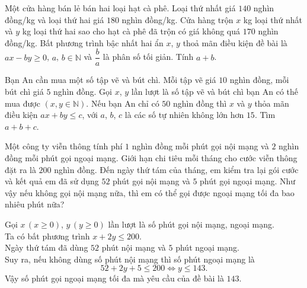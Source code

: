 \begin{bt}%
	Một cửa hàng bán lẻ bán hai loại hạt cà phê. Loại thứ nhất giá $140$ nghìn đồng/kg và loại thứ hai giá $180$ nghìn đồng/kg. Cửa hàng trộn $x$ kg loại thứ nhất và $y$ kg loại thứ hai sao cho hạt cà phê đã trộn có giá không quá $170$ nghìn đồng/kg. Bất phương trình bậc nhất hai ẩn $x$, $y$ thoả mãn điều kiện đề bài là $ax-by\ge 0$, $a$, $b\in \mathbb{N}$ và $\dfrac{b}{a}$ là phân số tối giản. Tính $a+b$. 
	
\end{bt}

\begin{bt}%
	Bạn An cần mua một số tập vẽ và bút chì. Mỗi tập vẽ giá $10$ nghìn đồng, mỗi bút chì giá $5$ nghìn đồng. Gọi $x$, $y$ lần lượt là số tập vẽ và bút chì bạn $\mathrm{An}$ có thế mua được $(x, y \in \mathbb{N})$. Nếu bạn An chỉ có $50$ nghìn đồng thì $x$ và $y$ thỏa mãn điều kiện $ a x + by \leq c$, với $a$, $b$, $c$ là các số tự nhiên không lớn hơn $15$. Tìm $ a+ b + c$.
	
\end{bt}

\begin{bt}%
	Một công ty viễn thông tính phí $1$ nghìn đồng mỗi phút gọi nội mạng và $2$ nghìn đồng mỗi phút gọi ngoại mạng. Giới hạn chi tiêu mỗi tháng cho cước viễn thông đặt ra là $200$ nghìn đồng. Đến ngày thứ tám của tháng, em kiểm tra lại gói cước và kết quả em đã sử dụng $52$ phút gọi nội mạng và $5$ phút gọi ngoại mạng. Như vậy nếu không gọi nội mạng nữa, thì em có thể gọi được ngoại mạng tối đa bao nhiêu phút nữa?
	
	\loigiai
	{
		Gọi $x\,(x\ge 0)$, $y\,(y\ge 0)$ lần lượt là số phút gọi nội mạng, ngoại mạng.\\
		Ta có bất phương trình $x + 2y \le 200$.\\
		Ngày thứ tám đã dùng $52$ phút nội mạng và $5$ phút ngoại mạng.\\
		Suy ra, nếu không dùng số phút nội mạng thì số phút ngoại mạng là $$52 + 2y + 5 \le 200 \Leftrightarrow y \le 143.$$
		Vậy số phút gọi ngoại mạng tối đa mà yêu cầu của đề bài là $143$.
	}
\end{bt}

